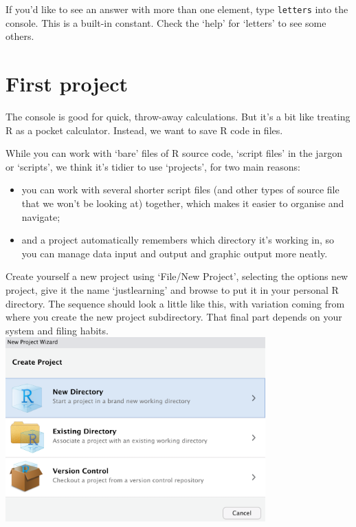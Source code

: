 \documentclass[
]{book}
\providecommand{\tightlist}{%
  \setlength{\itemsep}{0pt}\setlength{\parskip}{0pt}}
\begin{document}
If you'd like to see an answer with more than one element, type \texttt{letters} into the console. This is a built-in constant. Check the `help' for `letters' to see some others.

\hypertarget{first-project}{%
\section{First project}\label{first-project}}

The console is good for quick, throw-away calculations. But it's a bit like treating R as a pocket calculator. Instead, we want to save R code in files.

While you can work with `bare' files of R source code, `script files' in the jargon or `scripts', we think it's tidier to use `projects', for two main reasons:

\begin{itemize}
\tightlist
\item
  you can work with several shorter script files (and other types of source file that we won't be looking at) together, which makes it easier to organise and navigate;
\item
  and a project automatically remembers which directory it's working in, so you can manage data input and output and graphic output more neatly.
\end{itemize}

Create yourself a new project using `File/New Project', selecting the options new project, give it the name `justlearning' and browse to put it in your personal R directory. The sequence should look a little like this, with variation coming from where you create the new project subdirectory. That final part depends on your system and filing habits.
\includegraphics[width=0.75\textwidth,height=\textheight]{images/new project 1.png}
\end{document}
